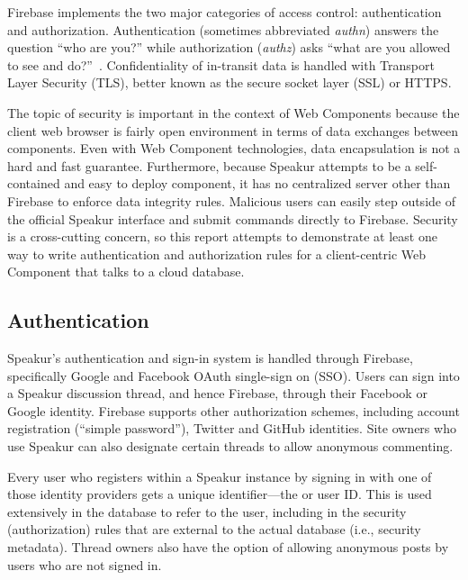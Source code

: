 Firebase implements the two major categories of access control: authentication and 
authorization. 
Authentication (sometimes abbreviated \textit{authn}) answers the question ``who are you?'' 
while authorization (\textit{authz}) asks ``what are you allowed to see and do?''~\cite{stallings2011}.
Confidentiality of in-transit data is handled with Transport Layer Security (TLS), 
better known as the secure socket layer (SSL) or HTTPS.

The topic of security is important in the context of Web Components because the client web browser is fairly open environment in terms of data exchanges between components. 
Even with Web Component technologies, data encapsulation is not a hard and fast guarantee. 
Furthermore, because Speakur attempts to be a self-contained and easy to deploy component, 
it has no centralized server other than Firebase to enforce data integrity rules. 
Malicious users can easily step outside of the official Speakur interface and submit commands directly to Firebase.
Security is a cross-cutting concern, so this report attempts to demonstrate at least one way to write authentication and authorization rules for a client-centric Web Component that talks to a cloud database.

\subsection{Authentication}
Speakur's authentication and sign-in system is handled through Firebase, 
specifically Google and Facebook OAuth single-sign on (SSO).
Users can sign into a Speakur discussion thread, and hence Firebase, through their Facebook or Google identity.
Firebase supports other authorization schemes, including account registration (``simple password''), Twitter and GitHub identities.
Site owners who use Speakur can also designate certain threads to allow anonymous commenting.

Every user who registers within a Speakur instance by signing in with one of those identity providers gets a unique identifier---the  or user ID. 
This  is used extensively in the database to refer to the user, including in the security (authorization) rules that are external to the actual database (i.e., security metadata). 
Thread owners also have the option of allowing anonymous posts by users who are not signed in.


